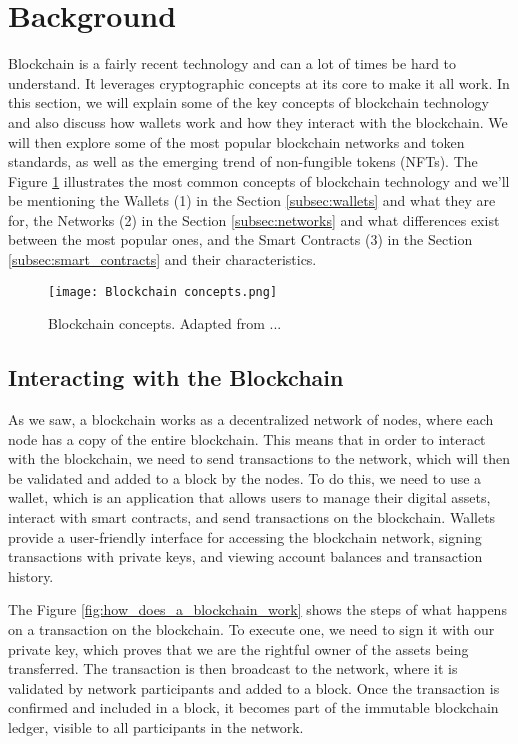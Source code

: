 \section{Background}
\label{sec:background}

Blockchain is a fairly recent technology and can a lot of times be hard to understand. It leverages cryptographic concepts at its core to make it all work. In this section, we will explain some of the key concepts of blockchain technology and also discuss how wallets work and how they interact with the blockchain. We will then explore some of the most popular blockchain networks and token standards, as well as the emerging trend of non-fungible tokens (NFTs). The Figure \ref{fig:blockchain_concepts} illustrates the most common concepts of blockchain technology and we'll be mentioning the Wallets (1) in the Section \ref{subsec:wallets} and what they are for, the Networks (2) in the Section \ref{subsec:networks} and what differences exist between the most popular ones, and the Smart Contracts (3) in the Section \ref{subsec:smart_contracts} and their characteristics.

\begin{figure}[H]
    \texttt{[image: Blockchain concepts.png]}
    \centering
    \caption[Blockchain concepts]{Blockchain concepts. Adapted from ...}
    \label{fig:blockchain_concepts}
\end{figure}

\subsection{Interacting with the Blockchain}
\label{subsec:interacting_with_the_blockchain}

As we saw, a blockchain works as a decentralized network of nodes, where each node has a copy of the entire blockchain. This means that in order to interact with the blockchain, we need to send transactions to the network, which will then be validated and added to a block by the nodes. To do this, we need to use a wallet, which is an application that allows users to manage their digital assets, interact with smart contracts, and send transactions on the blockchain. Wallets provide a user-friendly interface for accessing the blockchain network, signing transactions with private keys, and viewing account balances and transaction history.

The Figure \ref{fig:how_does_a_blockchain_work} shows the steps of what happens on a transaction on the blockchain. To execute one, we need to sign it with our private key, which proves that we are the rightful owner of the assets being transferred. The transaction is then broadcast to the network, where it is validated by network participants and added to a block. Once the transaction is confirmed and included in a block, it becomes part of the immutable blockchain ledger, visible to all participants in the network.

